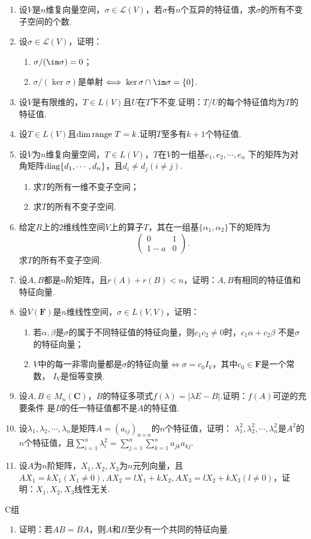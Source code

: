 \begin{enumerate}
    \item 设$V$是$n$维复向量空间，$\sigma\in \mathcal{L}(V)$，若$\sigma$有$n$个互异的特征值，求$\sigma$的所有不变子空间的个数.
    \item 设$\sigma\in \mathcal{L}(V)$，证明：
    \begin{enumerate}[label=(\arabic*)]
        \item $\sigma/(\im \sigma)=0$；

        \item $\sigma/(\ker \sigma)$是单射$\iff \ker \sigma\cap\im \sigma=\{0\}$.
    \end{enumerate}
    \item 设$V$是有限维的，$T\in L(V)$且$U$在$T$下不变.证明：$T/U$的每个特征值均为$T$的特征值.
	\item 设$T\in L(V)$且$\dim\textup{range }T=k$.证明$T$至多有$k+1$个特征值.
	\item 设$V$为$n$维复向量空间，$T\in L(V)$，$T$在$V$的一组基$e_1,e_2,\cdots,e_n$
	下的矩阵为对角矩阵$\textup{diag}\{d_1,\cdots,d_n\}$，且$d_i\neq d_j(i\neq j)$.
    \begin{enumerate}[label=(\arabic*)]
        \item 求$T$的所有一维不变子空间；
        \item 求$T$的所有不变子空间.
    \end{enumerate}
	\item 给定$R$上的2维线性空间$V$上的算子$T$，其在一组基$\{\alpha_1,\alpha_2\}$下的矩阵为
	\[\begin{pmatrix}
		0 & 1 \\ 1-a & 0
	\end{pmatrix}.\]
    求$T$的所有不变子空间.
    \item 设$A,B$都是$n$阶矩阵，且$r(A)+r(B)<n$，证明：$A,B$有相同的特征值和特征向量.
	\item 设$V(\mathbf{F})$是$n$维线性空间，$\sigma\in L(V,V)$，证明：
	\begin{enumerate}[label=(\arabic*)]
        \item 若$\alpha,\beta$是$\sigma$的属于不同特征值的特征向量，则$c_1c_2\neq 0$时，$c_1\alpha+c_2\beta$
        不是$\sigma$的特征向量；
        \item $V$中的每一非零向量都是$\sigma$的特征向量$\iff\sigma=c_0I_V$，其中$c_0\in\mathbf{F}$是一个常数，
        $I_V$是恒等变换.
    \end{enumerate}
	\item 设$A,B\in M_n(\mathbf{C})$，$B$的特征多项式$f(\lambda)=|\lambda E-B|$.证明：$f(A)$可逆的充要条件
	是$B$的任一特征值都不是$A$的特征值.
	\item 设$\lambda_1,\lambda_2,\cdots,\lambda_n$是矩阵$A=(a_{ij})_{n\times n}$的$n$个特征值，证明：
	$\lambda_1^2,\lambda_2^2,\cdots,\lambda_n^2$是$A^2$的$n$个特征值，且$\sum\limits_{i=1}^{n}\lambda_i^2=
	\sum\limits_{j=1}^{n}\sum\limits_{k=1}^{n}a_{jk}a_{kj}$.
	\item 设$A$为$n$阶矩阵，$X_1,X_2,X_3$为$n$元列向量，且$AX_1=kX_1(X_1\neq 0),AX_2=lX_1+kX_2,
	AX_3=lX_2+kX_3(l\neq 0)$，证明：$X_1,X_2,X_3$线性无关.
\end{enumerate}
\centerline{\heiti C组}
\begin{enumerate}
    \item 证明：若$AB=BA$，则$A$和$B$至少有一个共同的特征向量.
\end{enumerate}

